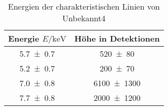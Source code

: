 
\begin{table}[H]
    \centering
    \caption{Energien der charakteristischen Linien von Unbekannt4}
    \label{tab:label}
    \begin{tabular}{c|c}
       Energie $E/\unit{\kilo\electronvolt}$ & Höhe in Detektionen \\
\hline
\num{5.7\pm 0.7} & \num{520\pm 80} \\ 
\num{5.2\pm 0.7} & \num{200\pm 70} \\ 
\num{7.0\pm 0.8} & \num{6100\pm 1300} \\ 
\num{7.7\pm 0.8} & \num{2000\pm 1200} \\ 

    \end{tabular}
\end{table}